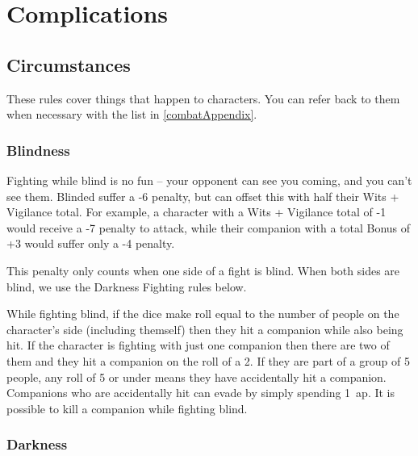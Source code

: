 \startcontents[Manoeuvres]

\section{Complications}

\begin{multicols}{2}

\subsection{Circumstances}

These rules cover things that happen to characters.
You can refer back to them when necessary with the list in \autoref{combatAppendix}.

\subsubsection[Blindness: Roll at -6 penalty, + (Wits + Vigilance)/ 2]{Blindness}

Fighting while blind is no fun -- your opponent can see you coming, and you can't see them.
Blinded suffer a -6 penalty, but can offset this with half their Wits + Vigilance total.
For example, a character with a Wits + Vigilance total of -1 would receive a -7 penalty to attack, while their companion with a total Bonus of +3 would suffer only a -4 penalty.

This penalty only counts when one side of a fight is blind. When both sides are blind, we use the Darkness Fighting rules below.

While fighting blind, if the dice make  roll equal to the number of people on the character's side (including themself) then they hit a companion while also being hit.
If the character is fighting with just one companion then there are two of them and they hit a companion on the roll of a 2.
If they are part of a group of 5 people, any roll of 5 or under means they have accidentally hit a companion.
Companions who are accidentally hit can evade by simply spending 1~\gls{ap}.
It is possible to kill a companion while fighting blind.

\subsubsection[Darkness: Roll Bonus cannot exceed Wits + Vigilance]{Darkness}
\label{darkness}


\end{multicols}
